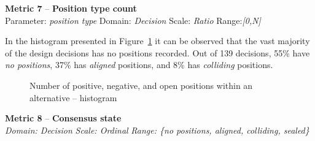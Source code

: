 \documentclass[article]{elsarticle}
\begin{document}
\clearpage
\noindent
\textbf{Metric 7} -- \textbf{Position type count}\\
Parameter: \emph{position type} Domain: \emph{Decision} Scale: \emph{Ratio} Range:\emph{[0,N]}

In the histogram presented in Figure~\ref{fig:M7-summative} it can be observed that the vast majority of the design decisions has no positions recorded. Out of 139 decisions, 55\% have \emph{no positions}, 37\% has \emph{aligned} positions, and 8\% has \emph{colliding} positions.
\begin{figure}
  \begin{center}

  \caption{Number of positive, negative, and open positions within an alternative -- histogram}
  \label{fig:M7-summative}
  \end{center}
\end{figure}

\vspace{1em}
\noindent
\textbf{Metric 8} -- \textbf{Consensus state}\\
\emph{Domain: Decision} \emph{Scale: Ordinal} \emph{Range: \{no positions, aligned, colliding, sealed\}}
\end{document}

